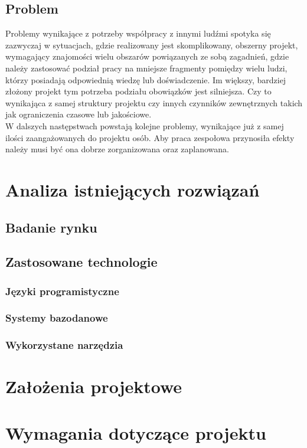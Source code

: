 \documentclass[eng,printmode]{mgr}
\begin{document}
\section{Problem}
Problemy wynikające z potrzeby współpracy z innymi ludźmi spotyka się zazwyczaj w sytuacjach, gdzie realizowany jest skomplikowany, obszerny projekt, wymagający znajomości wielu obszarów powiązanych ze sobą zagadnień, gdzie należy zastosować podział pracy na mniejsze fragmenty pomiędzy wielu ludzi, którzy posiadają odpowiednią wiedzę lub doświadczenie. Im większy, bardziej złożony projekt tym potrzeba podziału obowiązków jest silniejsza. Czy to wynikająca z samej struktury projektu czy innych czynników zewnętrznych takich jak ograniczenia czasowe lub jakościowe. \\
W dalszych następstwach powstają kolejne problemy, wynikające już z samej ilości zaangażowanych do projektu osób. Aby praca zespołowa przynosiła efekty należy musi być ona dobrze zorganizowana oraz zaplanowana.
\chapter{Analiza istniejących rozwiązań}  
\section{Badanie rynku}
\section{Zastosowane technologie}
\subsection{Języki programistyczne}
\subsection{Systemy bazodanowe}
\subsection{Wykorzystane narzędzia}
\chapter{Założenia projektowe}
\chapter{Wymagania dotyczące projektu}
\end{document}
